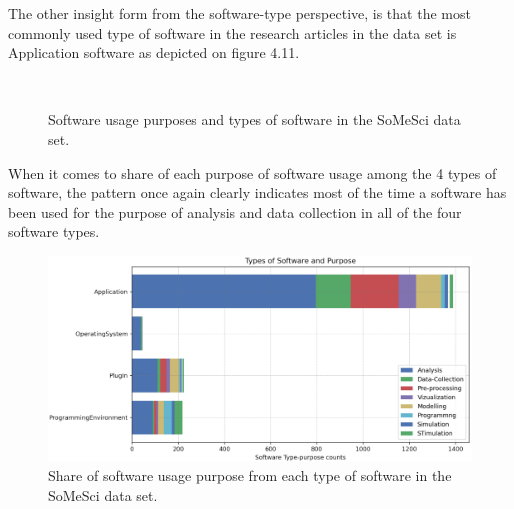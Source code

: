 The other insight form from  the software-type perspective, is that the most commonly used type of software in the research articles in the data set is Application software as depicted on figure 4.11. \\

\begin{figure}[h]
	\myfloatalign
	 \quad
	 \\
	\caption{Software usage purposes and types of software in the SoMeSci data set.}
	
\end{figure}


When it comes to share of each purpose of software usage among the 4 types of software, the pattern once again clearly indicates most of the time a software has been used for the purpose of analysis and data collection in all of the four software types. \\

\begin{figure}[htbp]
	\centering
	\includegraphics[width=1\textwidth]{4.graphics/figures/ch_4/analysisresults/6.Types of Software and Purpose stacked bar}
	\caption{Share of software usage purpose from each type of software in the \ac{SoMeSci} data set.}
	\label{fig:chapter03:setup}
\end{figure}

